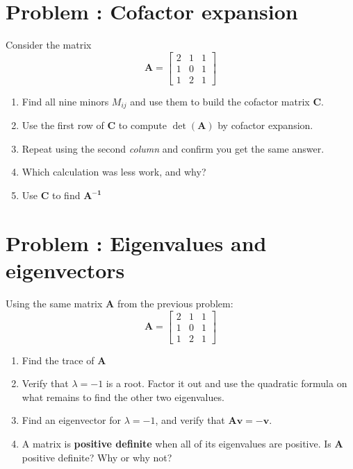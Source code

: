 \documentclass[11pt]{article}
\newcounter{problem}
\newcommand{\problem}[1]{\stepcounter{problem}\section*{Problem \theproblem: #1}}
\begin{document}
\problem{Cofactor expansion}
Consider the matrix
\[\mathbf{A} = \begin{bmatrix} 2 & 1 & 1 \\ 1 & 0 & 1 \\ 1 & 2 & 1 \end{bmatrix}\]

\begin{enumerate}[label=\alph*.]
\item Find all nine minors $M_{ij}$ and use them to build the cofactor
  matrix $\mathbf{C}$.
\item Use the first row of $\mathbf{C}$ to compute $\det(\mathbf{A})$
  by cofactor expansion.
\item Repeat using the second \emph{column} and confirm you get the same answer.
\item Which calculation was less work, and why?
\item Use $\mathbf{C}$ to find $\mathbf{A^{-1}}$
\end{enumerate}

\problem{Eigenvalues and eigenvectors}

Using the same matrix $\mathbf{A}$ from the previous problem:
\[
\mathbf{A} = \begin{bmatrix} 2 & 1 & 1 \\ 1 & 0 & 1 \\ 1 & 2 & 1 \end{bmatrix}
\]

\begin{enumerate}[label=\alph*.]
\item Find the trace of $\mathbf{A}$
\item Verify that $\lambda = -1$ is a root. Factor it out and use the
  quadratic formula on what remains to find the other two eigenvalues.
\item Find an eigenvector for $\lambda = -1$, and verify that
  $\mathbf{A}\mathbf{v} = -\mathbf{v}$.
\item A matrix is \textbf{positive definite}
  when all of its eigenvalues are positive. Is $\mathbf{A}$ positive
  definite? Why or why not?
  
\end{enumerate}


\end{document}

